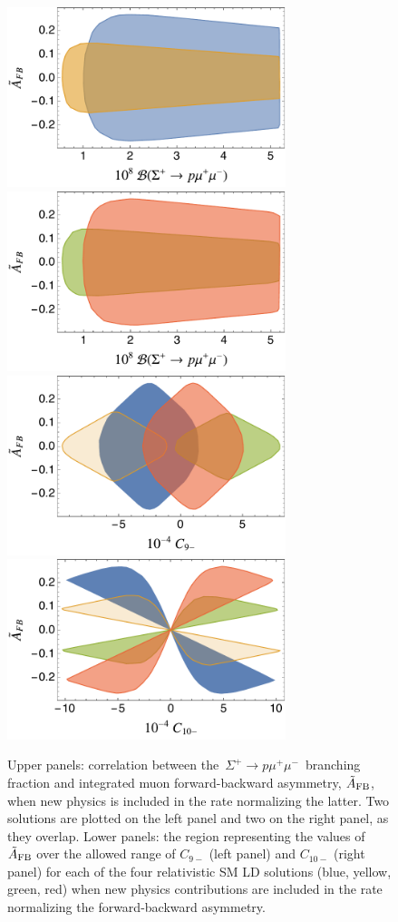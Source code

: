 \documentclass[amsmath,amssymb,aps,nofootinbib,prd,preprint,superscriptaddress,tightenlines,a4paper,bm]{revtex4-2}
\begin{document}
\begin{figure}[t]
\includegraphics[width=3.2in]{afb-br21.pdf} ~ ~ \includegraphics[width=3.2in]{afb-br22.pdf} \vspace{4ex} \\
\includegraphics[width=3.2in]{afbc9m2.pdf} ~ ~ \includegraphics[width=3.2in]{afbc10m2.pdf}
\caption{Upper panels: correlation between the \,$\Sigma^+\to p \mu^+\mu^-$\, branching fraction and integrated muon forward-backward asymmetry, $\tilde{A}_{\rm FB}$, when new physics is included in the rate normalizing the latter.
Two solutions are plotted on the left panel and two on the right panel, as they overlap.
Lower panels: the region representing the values of $\tilde{A}_{\rm FB}$ over the allowed range of $C_{9-}$ (left panel) and $C_{10-}$ (right panel) for each of the four relativistic SM LD solutions (blue, yellow, green, red) when new physics contributions are included in the rate normalizing the forward-backward asymmetry.}
    \label{fig:asym_NP2} \bigskip
\end{figure}
\end{document}
